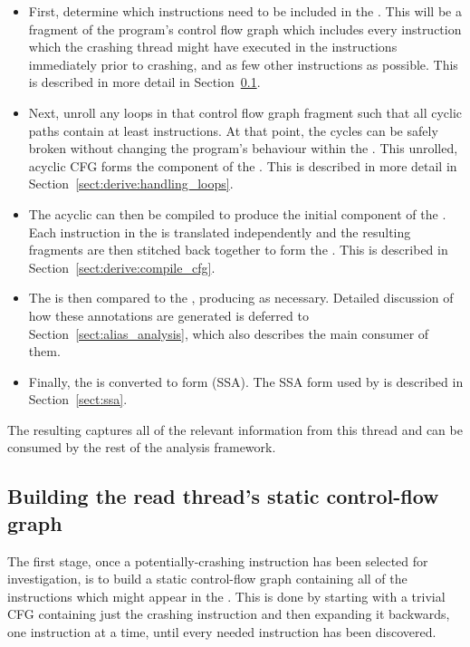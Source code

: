 \begin{itemize}
\item First, determine which instructions need to be included in the
  {\StateMachine}.  This will be a fragment of the program's control
  flow graph which includes every instruction which the crashing
  thread might have executed in the \backref{$\alpha$} instructions
  immediately prior to crashing, and as few other instructions as
  possible.  This is described in more detail in
  Section~\ref{sect:derive:build_static_cfg}.
\item Next, unroll any loops in that control flow graph fragment such
  that all cyclic paths contain at least \backref{$\alpha$}
  instructions.  At that point, the cycles can be safely broken
  without changing the program's behaviour within the
  .  This unrolled, acyclic CFG forms the
   component of the {\StateMachine}.  This is described
  in more detail in Section~\ref{sect:derive:handling_loops}.
\item The acyclic  can then be compiled to produce the
  initial  component of the {\StateMachine}.  Each
  instruction in the  is translated independently and the
  resulting fragments are then stitched back together to form the
  .  This is described in
  Section~\ref{sect:derive:compile_cfg}.
\item The  is then compared to the , producing  as necessary.
  Detailed discussion of how these annotations are generated is
  deferred to Section~\ref{sect:alias_analysis}, which also describes
  the main consumer of them.
\item Finally, the  is converted to
   form (SSA).  The SSA form
  used by {\technique} is described in Section~\ref{sect:ssa}.
\end{itemize}

The resulting {\StateMachine} captures all of the relevant information
from this thread and can be consumed by the rest of the analysis
framework.

\subsection{Building the read thread's static control-flow graph}
\label{sect:derive:build_static_cfg}
The first stage, once a potentially-crashing instruction has been
selected for investigation, is to build a static control-flow graph
containing all of the instructions which might appear in the
.  This is done by starting with a trivial
CFG containing just the crashing instruction and then expanding it
backwards, one instruction at a time, until every needed instruction
has been discovered.

